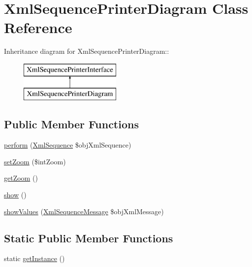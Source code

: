 \hypertarget{class_xml_sequence_printer_diagram}{
\section{XmlSequencePrinterDiagram Class Reference}
\label{class_xml_sequence_printer_diagram}
}
Inheritance diagram for XmlSequencePrinterDiagram::\begin{figure}[H]
\begin{center}
\leavevmode
\includegraphics[height=2cm]{class_xml_sequence_printer_diagram}
\end{center}
\end{figure}
\subsection*{Public Member Functions}
\begin{CompactItemize}
\item 
\hyperlink{class_xml_sequence_printer_diagram_7a8a4630e9f25847da0a6de87a5ab7e0}{perform} (\hyperlink{class_xml_sequence}{XmlSequence} \$objXmlSequence)
\item 
\hyperlink{class_xml_sequence_printer_diagram_581d130f5746b5b63036e6f7ee5208fd}{setZoom} (\$intZoom)
\item 
\hyperlink{class_xml_sequence_printer_diagram_f14ce9063b029367062cfca60b3236af}{getZoom} ()
\item 
\hyperlink{class_xml_sequence_printer_diagram_2b8e3779f5bd8c38f70307574859bd36}{show} ()
\item 
\hyperlink{class_xml_sequence_printer_diagram_6562038bc417e04c0db2cd4b55403b06}{showValues} (\hyperlink{class_xml_sequence_message}{XmlSequenceMessage} \$objXmlMessage)
\end{CompactItemize}
\subsection*{Static Public Member Functions}
\begin{CompactItemize}
\item 
static \hyperlink{class_xml_sequence_printer_diagram_c93fbec81f07e5d15f80db907e63dc10}{getInstance} ()
\end{CompactItemize}
